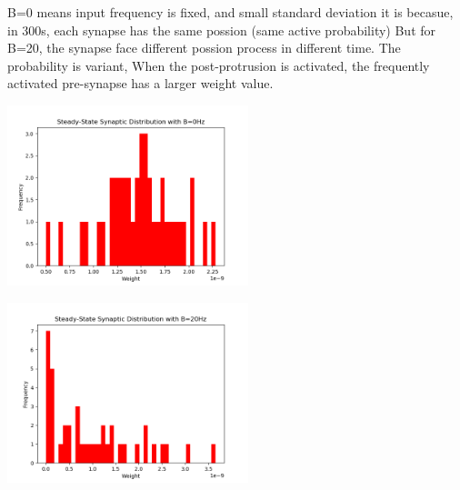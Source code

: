 \documentclass[fleqn,11pt]{article}
\begin{document}
\par B=0 means input frequency is fixed, and small standard deviation
it is becasue, in 300s, each synapse has the same possion (same active probability)
But for B=20, the synapse face different possion process in different time.
The probability is variant, When the post-protrusion is activated, the frequently activated pre-synapse has a larger weight value.
\begin{center}
  \begin{minipage}{\linewidth} 
  \begin{minipage}{0.45\linewidth}
    \includegraphics[width=7cm]{graphs/PartB_Questio4_B_0Hz_2.png}
  \end{minipage}
  \hspace{0.05\linewidth}
  \begin{minipage}{0.45\linewidth}
    \includegraphics[width=7cm]{graphs/PartB_Questio4_B_20Hz.png}
  \end{minipage}
\end{minipage} 
\end{center}

\newpage
\end{document}
